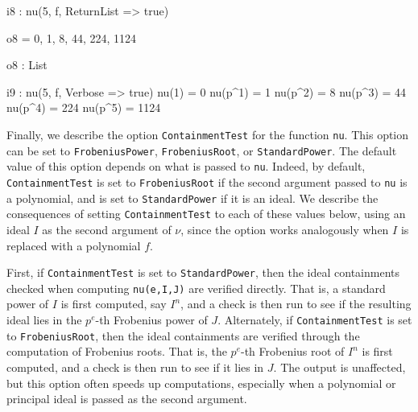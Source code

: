 \documentclass{amsart}
\begin{document}
{\small
{}
\begin{MyVerbatim}

i8 : nu(5, f, ReturnList => true)

o8 = {0, 1, 8, 44, 224, 1124}

o8 : List

i9 : nu(5, f, Verbose => true)
nu(1) = 0
nu(p^1) = 1
nu(p^2) = 8
nu(p^3) = 44
nu(p^4) = 224
nu(p^5) = 1124
\end{MyVerbatim}
}


Finally, we describe the option {\tt ContainmentTest} for the function {\tt nu}.
This option can be set to {\tt FrobeniusPower}, {\tt FrobeniusRoot}, or {\tt StandardPower}. The default value of this option depends on what is passed to {\tt nu}. Indeed, by default, {\tt ContainmentTest} is set to {\tt FrobeniusRoot} if the second argument passed to {\tt nu} is a polynomial, and is set to {\tt StandardPower} if it is an ideal.  We describe the consequences of setting {\tt ContainmentTest} to each of these values below, using an ideal $I$ as the second argument of $\nu$, since the option works analogously when $I$ is replaced with a polynomial $f$. 


First, if {\tt ContainmentTest} is set to {\tt StandardPower}, then the ideal containments checked when computing {\tt nu(e,I,J)} are verified directly.
That is, a standard power of $I$ is first computed, say $I^n$, and a check is then run to see if the resulting ideal lies in the $p^e$-th Frobenius power of $J$.
Alternately, if {\tt ContainmentTest} is set to {\tt FrobeniusRoot}, then the ideal containments are verified through the computation of Frobenius roots.  That is, the $p^e$-th Frobenius root of $I^n$ is first computed, and a check is then run to see if it lies in $J$.  The output is unaffected, but this option often speeds up computations, especially when a polynomial or principal ideal is passed as the second argument.

\end{document}
